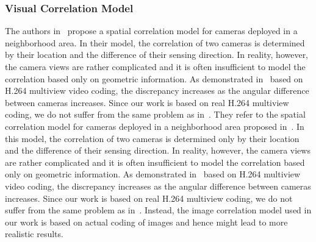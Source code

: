 \subsubsection{Visual Correlation Model}
The authors in~\cite{SpatialCorrelationModel} propose a spatial correlation model for cameras deployed in a neighborhood area.
In their model, the correlation of two cameras is determined by their location and the difference of their sensing direction.
In reality, however, the camera views are rather complicated and it is often insufficient to model the correlation based only on geometric information.
As demonstrated in~\cite{RealisticModel} based on H.264 multiview video coding, the discrepancy increases as the angular difference between cameras increases.
Since our work is based on real H.264 multiview coding, we do not suffer from the same problem as in~\cite{SpatialCorrelationModel}.
%
They refer to the spatial correlation model for cameras deployed in a neighborhood area proposed in~\cite{SpatialCorrelationModel}.
In this model, the correlation of two cameras is determined only by their location and the difference of their sensing direction.
In reality, however, the camera views are rather complicated and it is often insufficient to model the correlation based only on geometric information.
As demonstrated in~\cite{RealisticModel} based on H.264 multiview video coding, the discrepancy increases as the angular difference between cameras increases.
Since our work is based on real H.264 multiview coding, we do not suffer from the same problem as in~\cite{DMCPclustering,imageModelCluster}.
Instead, the image correlation model used in our work is based on actual coding of images and hence might lead to more realistic results.
%
